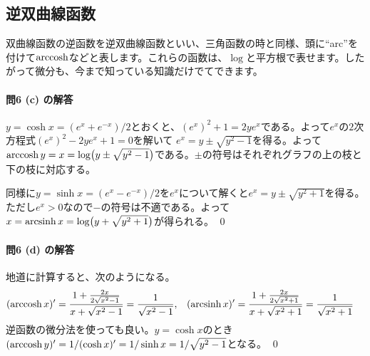 \subsection{逆双曲線函数}

双曲線函数の逆函数を逆双曲線函数といい、三角函数の時と同様、頭に``arc''を付けて$\operatorname{arccosh}$などと表します。これらの函数は、$\log$と平方根で表せます。したがって微分も、今まで知っている知識だけでてできます。

\paragraph{問6 (c) の解答}

$y=\cosh x = (e^x+e^{-x})/2$とおくと、$(e^x)^2 + 1 = 2ye^x$である。よって$e^x$の$2$次方程式$(e^x)^2 - 2y e^x+1=0$を解いて
$e^x = y\pm\sqrt{y^2-1}$を得る。よって$\operatorname{arccosh} y = x = \log\bigl(y\pm\sqrt{y^2-1}\bigr)$である。$\pm$の符号はそれぞれグラフの上の枝と下の枝に対応する。

同様に$y=\sinh x = (e^x - e^{-x})/2$を$e^x$について解くと$e^x=y\pm\sqrt{y^2+1}$を得る。ただし$e^x>0$なので$-$の符号は不適である。よって$x=\operatorname{arcsinh} x=\log\bigl(y+\sqrt{y^2+1}\bigr)$が得られる。 \qed

\paragraph{問6 (d) の解答} 地道に計算すると、次のようになる。
\begin{align*}
(\operatorname{arccosh} x)' &= \frac{1+\frac{2x}{2\sqrt{x^2-1}}}{x+\sqrt{x^2-1}} = \frac{1}{\sqrt{x^2-1}}, &
(\operatorname{arcsinh} x)' &= \frac{1+\frac{2x}{2\sqrt{x^2+1}}}{x+\sqrt{x^2+1}} = \frac{1}{\sqrt{x^2+1}}
\end{align*}
逆函数の微分法を使っても良い。$y=\cosh x$のとき$(\operatorname{arccosh} y)' = 1 / (\cosh x)' = 1 / \sinh x = 1 / \sqrt{y^2-1}$となる。 \qed


